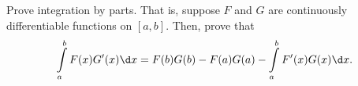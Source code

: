 \begin{problem}
  Prove integration by parts.
  That is, suppose $F$ and $G$ are continuously differentiable functions on $[a, b]$.
  Then, prove that
  \[
    \int\limits_a^b F(x)G'(x) \d x = F(b)G(b) - F(a)G(a) - \int\limits_a^b F'(x)G(x) \d x.
  \]
\end{problem}

\begin{answer}

\end{answer}
